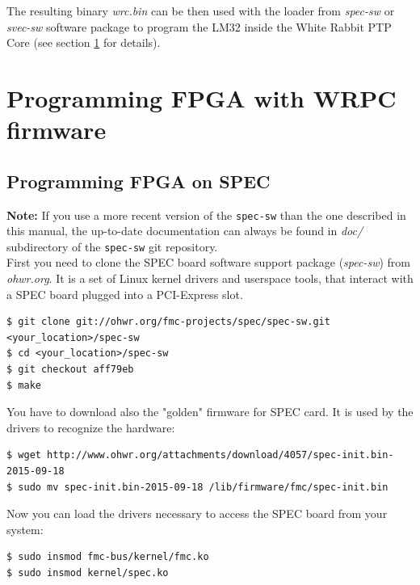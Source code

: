\documentclass[a4paper, 12pt]{article}
\begin{document}
The resulting binary \textit{wrc.bin} can be then used with the loader from
\textit{spec-sw} or \textit{svec-sw} software package to program the LM32 inside
the White Rabbit PTP Core (see section \ref{Programming FPGA} for details).

\newpage
\section{Programming FPGA with WRPC firmware}
\label{Programming FPGA}

\subsection{Programming FPGA on SPEC}
\label{Programming FPGA on SPEC}

\textbf{Note:} If you use a more recent version of the \texttt{spec-sw} than the
one described in this manual, the up-to-date documentation can always be found
in \textit{doc/} subdirectory of the \texttt{spec-sw} git repository.\\

First you need to clone the SPEC board software support package
(\textit{spec-sw}) from \textit{ohwr.org}. It is a set of Linux kernel drivers and
userspace tools, that interact with a SPEC board plugged into a PCI-Express
slot.\\

\begin{lstlisting}
$ git clone git://ohwr.org/fmc-projects/spec/spec-sw.git <your_location>/spec-sw
$ cd <your_location>/spec-sw
$ git checkout aff79eb
$ make
\end{lstlisting}

You have to download also the "golden" firmware for SPEC card. It is used by
the drivers to recognize the hardware:
\begin{lstlisting}
$ wget http://www.ohwr.org/attachments/download/4057/spec-init.bin-2015-09-18
$ sudo mv spec-init.bin-2015-09-18 /lib/firmware/fmc/spec-init.bin
\end{lstlisting}

Now you can load the drivers necessary to access the SPEC board from your
system:
\begin{lstlisting}
$ sudo insmod fmc-bus/kernel/fmc.ko
$ sudo insmod kernel/spec.ko
\end{lstlisting}
\end{document}
